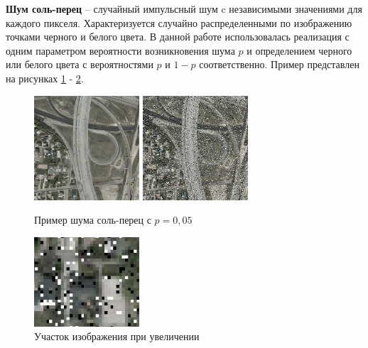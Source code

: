 {	 {\bf Шум соль-перец} -- случайный импульсный шум c независимыми значениями для каждого пикселя. Характеризуется случайно распределенными по изображению точками черного и белого цвета. В данной работе использовалась реализация с одним параметром вероятности возникновения шума $p$ и определением черного или белого цвета с вероятностями $p$ и $1-p$ соответственно. Пример представлен на рисунках \ref{noises sp} - \ref{noises sp big}.
	 
	\begin{figure}[H]
		\centering                             
		\includegraphics[width=0.35\textwidth,keepaspectratio]{noises/original.jpg}   
		\includegraphics[width=0.35\textwidth,keepaspectratio]{noises/sp.jpg}                 
		\centering\caption{ Пример шума соль-перец с $p=0{,}05$ }
		\label{noises sp}                           
	\end{figure}    

	\begin{figure}[H]
		\centering                             
		\includegraphics[width=0.35\textwidth,keepaspectratio]{noises/sp_big.jpg}                   
		\centering\caption{ Участок изображения при увеличении }
		\label{noises sp big}                           
	\end{figure}    
	
}

